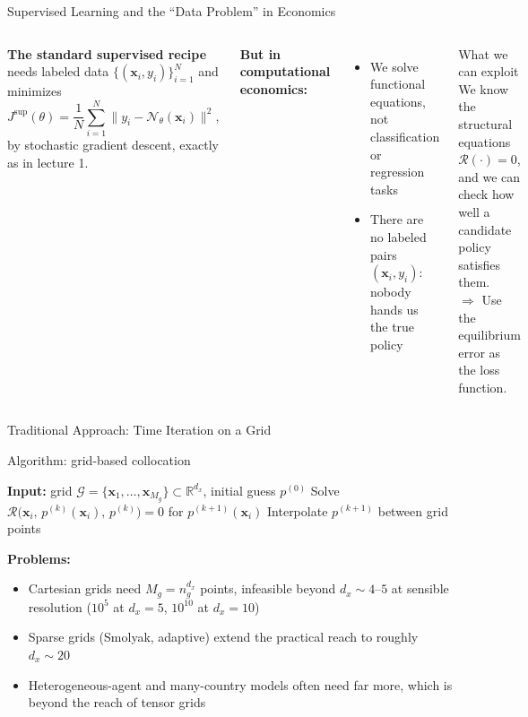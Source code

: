 \documentclass[aspectratio=169,11pt]{beamer}
\newcommand{\emphc}[1]{\textcolor{harvardcrimson}{#1}}
\newcommand{\x}{\bm{x}}
\newcommand{\R}{\mathbb{R}}
\newcommand{\param}{\theta}          %
\newcommand{\state}{\bm{x}}          %
\newcommand{\resid}{\mathcal{R}}     %
\newcommand{\net}{\mathcal{N}_{\param}} %
\begin{document}
\begin{frame}{Supervised Learning and the ``Data Problem'' in Economics}
\begin{columns}[T]
\textbf{The standard supervised recipe} needs labeled data $\{(\state_i, y_i)\}_{i=1}^N$ and minimizes
\[
J^{\mathrm{sup}}(\param) = \frac{1}{N}\sum_{i=1}^{N} \bigl\|y_i - \net(\state_i)\bigr\|^2 ,
\]
by stochastic gradient descent, exactly as in lecture 1.

\textbf{But in computational economics:}
\begin{itemize}\itemsep2pt
    \item We solve \emphc{functional equations}, not classification or regression tasks
    \item There are \emphc{no labeled pairs} $(\state_i, y_i)$: nobody hands us the true policy
\end{itemize}

\begin{block}{What we can exploit}
We \emphc{know} the structural equations $\resid(\cdot) = 0$, and we can \emphc{check} how well a candidate policy satisfies them.\\[2pt]
$\Rightarrow$ Use the \emphc{equilibrium error} as the loss function.
\end{block}
\end{columns}
\end{frame}

\begin{frame}{Traditional Approach: Time Iteration on a Grid}
\begin{block}{Algorithm: grid-based collocation}
\begin{algorithmic}
\footnotesize
\STATE \textbf{Input:} grid $\mathcal{G} = \{\state_1, \ldots, \state_{M_g}\} \subset \R^{d_x}$, initial guess $p^{(0)}$
    \FOR{each grid point $\state_i \in \mathcal{G}$}
        \STATE Solve $\resid\bigl(\state_i,\, p^{(k)}(\state_i),\, p^{(k)}\bigr) = 0$ for $p^{(k+1)}(\state_i)$
    \ENDFOR
    \STATE Interpolate $p^{(k+1)}$ between grid points
\ENDFOR
\end{algorithmic}
\end{block}

\vspace{0.3em}
\textbf{Problems:}
\begin{itemize}
    \item \emphc{Cartesian} grids need $M_g=n_g^{d_x}$ points, infeasible beyond $d_x\sim4\text{--}5$ at sensible resolution ($10^5$ at $d_x\!=\!5$, $10^{10}$ at $d_x\!=\!10$)
    \item \emphc{Sparse grids} (Smolyak, adaptive) extend the practical reach to roughly $d_x \sim 20$
    \item Heterogeneous-agent and many-country models often need far more, which is beyond the reach of tensor grids
\end{itemize}
\end{frame}
\end{document}
